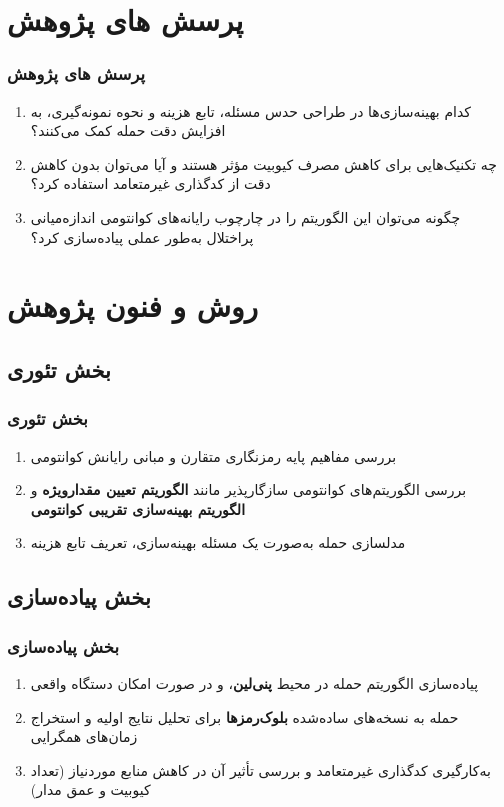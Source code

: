 \documentclass[xcolor=dvipsnames, professionalfonts, aspectratio=169, 11pt]{beamer}
\begin{document}
\section{پرسش های پژوهش}
\begin{frame}
    \frametitle{پرسش های پژوهش}
    \begin{enumerate}
        \item کدام بهینه‌سازی‌ها در طراحی حدس مسئله، تابع هزینه و نحوه نمونه‌گیری، به افزایش دقت حمله کمک می‌کنند؟
        \item چه تکنیک‌هایی برای کاهش مصرف کیوبیت مؤثر هستند و آیا می‌توان بدون کاهش دقت از کدگذاری غیرمتعامد استفاده کرد؟
        \item چگونه می‌توان این الگوریتم را در چارچوب رایانه‌های کوانتومی اندازه‌میانی پراختلال به‌طور عملی پیاده‌سازی کرد؟
    \end{enumerate}
\end{frame}

\section{روش و فنون پژوهش}
\subsection{بخش تئوری}
\begin{frame}
    \frametitle{بخش تئوری}
    \begin{enumerate}
        \item بررسی مفاهیم پایه رمزنگاری متقارن و مبانی رایانش کوانتومی
        \cite{nielsen2010quantum,hoffstein2014introduction}
        \item بررسی الگوریتم‌های کوانتومی سازگارپذیر مانند \textbf{الگوریتم تعیین مقدارویژه} و \textbf{الگوریتم بهینه‌سازی تقریبی کوانتومی}
        \cite{cerezo2021variational}
        \item مدلسازی حمله به‌صورت یک مسئله بهینه‌سازی، تعریف تابع هزینه
    \end{enumerate}
\end{frame}
\subsection{بخش پیاده‌سازی}
\begin{frame}
    \frametitle{بخش پیاده‌سازی}
    \begin{enumerate}
        \item پیاده‌سازی الگوریتم حمله در محیط \textbf{پنی‌لین}، و در صورت امکان دستگاه واقعی
        \item حمله به نسخه‌های ساده‌شده \textbf{بلوک‌رمزها} برای تحلیل نتایج اولیه و استخراج زمان‌های همگرایی
        \cite{hoffstein2014introduction}
        \item به‌کارگیری کدگذاری غیرمتعامد و بررسی تأثیر آن در کاهش منابع موردنیاز (تعداد کیوبیت و عمق مدار)
    \end{enumerate}
\end{frame}
\end{document}

